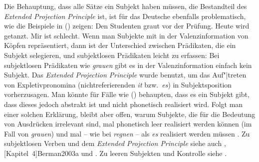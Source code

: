 Die Behauptung, dass alle Sätze ein Subjekt haben müssen, die Bestandteil des
\emph{Extended Projection Principle} ist,
ist für das Deutsche ebenfalls problematisch,
wie die Beispiele in () zeigen:
\eal
{}
\ex Den Studenten graut vor der Prüfung.
\ex Heute wird getanzt.
\ex Mir ist schlecht. 
\zl
Wenn man Subjekte mit in der Valenzinformation von Köpfen repräsentiert, dann
ist der Unterschied zwischen Prädikaten, die ein Subjekt selegieren, und subjektlosen
Prädikaten leicht zu erfassen: Bei subjektlosen Prädikaten wie \emph{grauen}
gibt es in der Valenzinformation einfach kein Subjekt.
Das \emph{Extended Projection Principle} wurde benutzt, um das Auf"|treten von Expletivpronomina
(nichtreferierenden \emph{it} bzw.\ \emph{es}) in Subjektsposition vorherzusagen.
Man könnte für Fälle wie () behaupten, dass es ein Subjekt gibt, dass
dieses jedoch abstrakt ist und nicht phonetisch realisiert wird. Folgt
man einer solchen Erklärung, bleibt aber offen, warum Subjekte, die für
die Bedeutung von Ausdrücken irrelevant sind, mal phonetisch leer realisiert werden
können (im Fall von \emph{grauen}) und mal -- wie bei \emph{regnen} --
als \emph{es} realisiert werden müssen \citep[]{Fanselow91a}. 
Zu subjektlosen Verben und dem
\emph{Extended Projection Principle} siehe auch , 
[Kapitel~4]{Berman2003a} und .
Zu leeren Subjekten und Kontrolle siehe .



